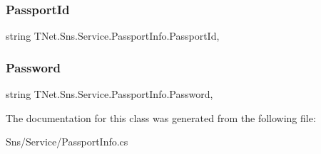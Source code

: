 \subsubsection{\texorpdfstring{Passport\+Id}{PassportId}}
{\footnotesize\ttfamily string T\+Net.\+Sns.\+Service.\+Passport\+Info.\+Passport\+Id\hspace{0.3cm}{\ttfamily [get]}, {\ttfamily [set]}}





\mbox{\label{class_t_net_1_1_sns_1_1_service_1_1_passport_info_aab7e520cd48d055423867d492211d047}} 
\subsubsection{\texorpdfstring{Password}{Password}}
{\footnotesize\ttfamily string T\+Net.\+Sns.\+Service.\+Passport\+Info.\+Password\hspace{0.3cm}{\ttfamily [get]}, {\ttfamily [set]}}







The documentation for this class was generated from the following file\+:\begin{DoxyCompactItemize}
\item 
Sns/\+Service/Passport\+Info.\+cs\end{DoxyCompactItemize}
